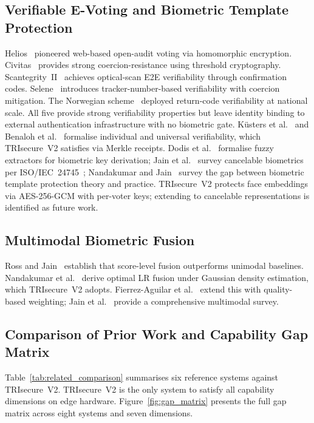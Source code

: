 \documentclass[pdflatex,sn-mathphys-num]{sn-jnl}%
\theoremstyle{thmstyleone}%
\theoremstyle{thmstyletwo}%
\theoremstyle{thmstylethree}%
\begin{document}
\subsection{Verifiable E-Voting and Biometric Template Protection}

Helios~\cite{adida2008helios} pioneered web-based open-audit voting via
homomorphic encryption. Civitas~\cite{clarkson2008civitas} provides strong
coercion-resistance using threshold cryptography.
Scantegrity~II~\cite{chaum2009scantegrity} achieves optical-scan E2E
verifiability through confirmation codes. Selene~\cite{ryan2016selene}
introduces tracker-number-based verifiability with coercion mitigation. The
Norwegian scheme~\cite{gjosteen2010norwegian} deployed return-code
verifiability at national scale. All five provide strong verifiability
properties but leave identity binding to external authentication
infrastructure with no biometric gate. K\"{u}sters et
al.~\cite{kusters2010accountability} and Benaloh et
al.~\cite{benaloh2011e2e} formalise individual and universal verifiability,
which TRIsecure~V2 satisfies via Merkle receipts. Dodis et
al.~\cite{dodis2004fuzzy} formalise fuzzy extractors for biometric key
derivation; Jain et al.~\cite{jain2008cancelable} survey cancelable
biometrics per ISO/IEC~24745~\cite{iso24745}; Nandakumar and
Jain~\cite{nandakumar2012biometric} survey the gap between biometric template
protection theory and practice. TRIsecure~V2 protects face embeddings via
AES-256-GCM with per-voter keys; extending to cancelable representations is
identified as future work.

\subsection{Multimodal Biometric Fusion}

Ross and Jain~\cite{ross2003multimodal} establish that score-level fusion
outperforms unimodal baselines. Nandakumar et al.~\cite{nandakumar2008fusion}
derive optimal LR fusion under Gaussian density estimation, which TRIsecure~V2
adopts. Fierrez-Aguilar et al.~\cite{fierrez2005fusion} extend this with
quality-based weighting; Jain et al.~\cite{jain2011multimodal} provide a
comprehensive multimodal survey.

\subsection{Comparison of Prior Work and Capability Gap Matrix}

Table~\ref{tab:related_comparison} summarises six reference systems against
TRIsecure~V2. TRIsecure~V2 is the only system to satisfy all capability
dimensions on edge hardware. Figure~\ref{fig:gap_matrix} presents the full gap
matrix across eight systems and seven dimensions.
\end{document}
